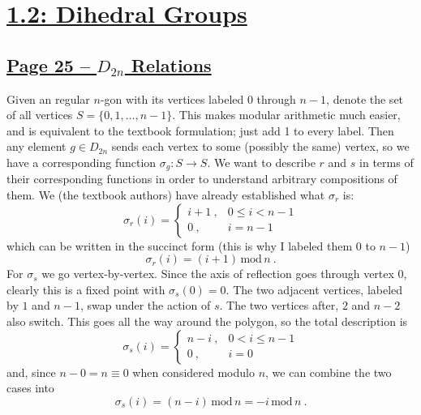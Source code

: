 \documentclass[]{article}
\newcommand{\md}{\,\text{mod}\,}
\begin{document}
\section*{\underline{1.2: Dihedral Groups}}

\subsection*{\underline{Page 25 -- $D_{2n}$ Relations}}
Given an regular $n$-gon with its vertices labeled 0 through $n-1$, denote the set of all vertices $S = \{0,1,\ldots, n-1\}$. This makes modular arithmetic much easier, and is equivalent to the textbook formulation; just add 1 to every label. Then any element $g \in D_{2n}$ sends each vertex to some (possibly the same) vertex, so we have a corresponding function $\sigma_g : S \to S$. We want to describe $r$ and $s$ in terms of their corresponding functions in order to understand arbitrary compositions of them. We (the textbook authors) have already established what $\sigma_r$ is:
\begin{equation}
\sigma_r(i) = \begin{cases}
i+1\ , & 0\leq i < n-1 \\
0\ , & i = n-1
\end{cases}
\end{equation}
which can be written in the succinct form (this is why I labeled them 0 to $n-1$)
\begin{equation}
\sigma_r(i) = (i+1)\md n\ .
\end{equation}
For $\sigma_s$ we go vertex-by-vertex. Since the axis of reflection goes through vertex $0$, clearly this is a fixed point with $\sigma_s(0) = 0$. The two adjacent vertices, labeled by $1$ and $n-1$, swap under the action of $s$. The two vertices after, $2$ and $n-2$ also switch. This goes all the way around the polygon, so the total description is
\begin{equation}
\sigma_s(i) = \begin{cases}
n-i\ , & 0< i \leq n-1\\
0\ , & i = 0
\end{cases}
\end{equation}
and, since $n-0 = n \equiv 0$ when considered modulo $n$, we can combine the two cases into
\begin{equation}
\sigma_s(i) = (n-i)\md n = -i\md n\ .
\end{equation}
\end{document}

